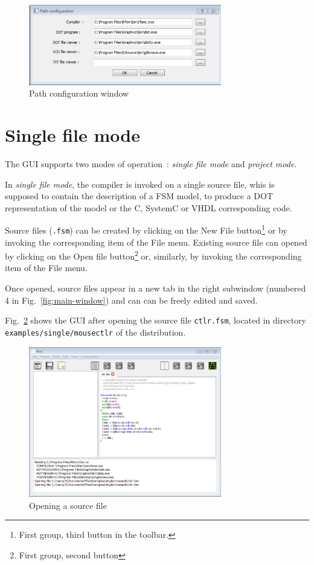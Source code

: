 \begin{figure}[h]
  \centering
  \includegraphics[width=0.75\textwidth]{figs/gui/pathconfig}
  \caption{Path configuration window}
  \label{fig:config-window}
\end{figure}

\section{Single file mode}
\label{sec:gui-single-file-mode}

The GUI supports two modes of operation~: \emph{single file mode} and \emph{project mode}. 

In \emph{single file mode}, the compiler is invoked on a single source file, whis is supposed to
contain the description of a FSM model, to produce a DOT representation of the model or the C,
SystemC or VHDL corresponding code.

Source files (\verb|.fsm|) can be created by clicking on the \textsf{New File} button\footnote{First
  group, third button in the toolbar.} or by invoking the corresponding item of the \textsf{File}
menu. Existing source file can opened by clicking on the \textsf{Open file} button\footnote{First
  group, second button} or, similarly, by invoking the corresponding item of the \textsf{File} menu.

Once opened, source files appear in a new tab in the right subwindow (numbered 4 in
Fig.~\ref{fig:main-window}) and can can be freely edited and saved. 

Fig.~\ref{fig:open-file} shows the GUI after
opening the source file \verb|ctlr.fsm|, located in directory \texttt{examples/single/mousectlr} of
the distribution.

\begin{figure}[h]
  \centering
  \includegraphics[width=0.75\textwidth]{figs/gui/open-file}
  \caption{Opening a source file}
  \label{fig:open-file}
\end{figure}

